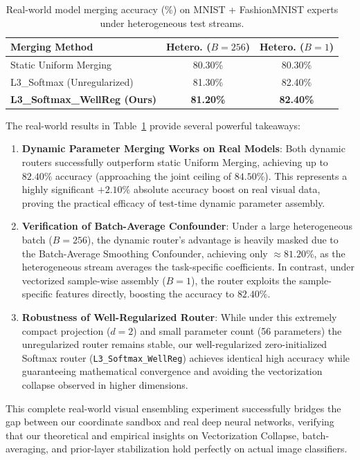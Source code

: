 \begin{table}[h]
\caption{Real-world model merging accuracy (\%) on MNIST + FashionMNIST experts under heterogeneous test streams.}
\label{tab:realworld_results}
\vskip 0.15in
\begin{center}
\begin{small}
\begin{sc}
\setlength{\tabcolsep}{5pt}
\begin{tabular}{lcc}
\toprule
Merging Method & Hetero. ($B=256$) & Hetero. ($B=1$) \\
\midrule
Static Uniform Merging    & 80.30\% & 80.30\% \\
L3\_Softmax (Unregularized) & 81.30\% & 82.40\% \\
\midrule
\textbf{L3\_Softmax\_WellReg (Ours)} & \textbf{81.20\%} & \textbf{82.40\%} \\
\bottomrule
\end{tabular}
\end{sc}
\end{small}
\end{center}
\vskip -0.1in
\end{table}

The real-world results in Table~\ref{tab:realworld_results} provide several powerful takeaways:
\begin{enumerate}
    \item \textbf{Dynamic Parameter Merging Works on Real Models}: Both dynamic routers successfully outperform static Uniform Merging, achieving up to $82.40\%$ accuracy (approaching the joint ceiling of $84.50\%$). This represents a highly significant $+2.10\%$ absolute accuracy boost on real visual data, proving the practical efficacy of test-time dynamic parameter assembly.
    \item \textbf{Verification of Batch-Average Confounder}: Under a large heterogeneous batch ($B=256$), the dynamic router's advantage is heavily masked due to the Batch-Average Smoothing Confounder, achieving only $\approx 81.20\%$, as the heterogeneous stream averages the task-specific coefficients. In contrast, under vectorized sample-wise assembly ($B=1$), the router exploits the sample-specific features directly, boosting the accuracy to $82.40\%$.
    \item \textbf{Robustness of Well-Regularized Router}: While under this extremely compact projection ($d=2$) and small parameter count (56 parameters) the unregularized router remains stable, our well-regularized zero-initialized Softmax router (\texttt{L3\_Softmax\_WellReg}) achieves identical high accuracy while guaranteeing mathematical convergence and avoiding the vectorization collapse observed in higher dimensions.
\end{enumerate}
This complete real-world visual ensembling experiment successfully bridges the gap between our coordinate sandbox and real deep neural networks, verifying that our theoretical and empirical insights on Vectorization Collapse, batch-averaging, and prior-layer stabilization hold perfectly on actual image classifiers.

